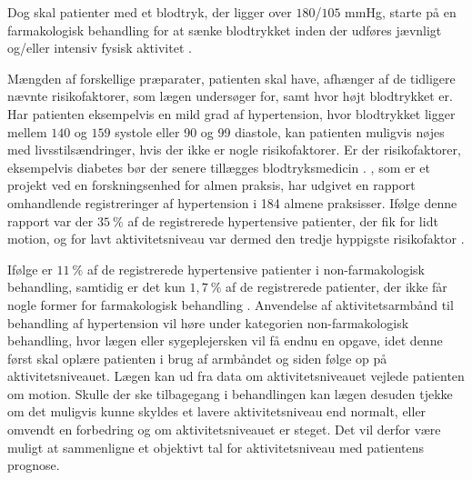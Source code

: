 Dog skal patienter med et blodtryk, der ligger over $180$/$105$ mmHg, starte på en farmakologisk behandling for at sænke blodtrykket inden der udføres jævnligt og/eller intensiv fysisk aktivitet \citep{pedersen2016}. %

Mængden af forskellige præparater, patienten skal have, afhænger af de tidligere nævnte risikofaktorer, som lægen undersøger for, samt hvor højt blodtrykket er. Har patienten eksempelvis en mild grad af hypertension, hvor blodtrykket ligger mellem $140$ og $159$ systole eller 90 og 99 diastole, kan patienten muligvis nøjes med livsstilsændringer, hvis der ikke er nogle risikofaktorer. Er der risikofaktorer, eksempelvis diabetes bør der senere tillægges blodtryksmedicin \citep{bech2015}. \citeauthor{munck2007}, som er et projekt ved en forskningsenhed for almen praksis, har udgivet en rapport omhandlende registreringer af hypertension i 184 almene praksisser. Ifølge denne rapport var der $35~\%$ af de registrerede hypertensive patienter, der fik for lidt motion, og for lavt aktivitetsniveau var dermed den tredje hyppigste risikofaktor \citep{munck2007}.

Ifølge \cite{munck2007} er $11~\%$ af de registrerede hypertensive patienter i non-farmakologisk behandling, samtidig er det kun $1,7~\%$ af de registrerede patienter, der ikke får nogle former for farmakologisk behandling \citep{munck2007}.
Anvendelse af aktivitetsarmbånd til behandling af hypertension vil høre under kategorien non-farmakologisk behandling, hvor lægen eller sygeplejersken vil få endnu en opgave, idet denne først skal oplære patienten i brug af armbåndet og siden følge op på aktivitetsniveauet. Lægen kan ud fra data om aktivitetsniveauet vejlede patienten om motion. Skulle der ske tilbagegang i behandlingen kan lægen desuden tjekke om det muligvis kunne skyldes et lavere aktivitetsniveau end normalt, eller omvendt en forbedring og om aktivitetsniveauet er steget. Det vil derfor være muligt at sammenligne et objektivt tal for aktivitetsniveau med patientens prognose. 

